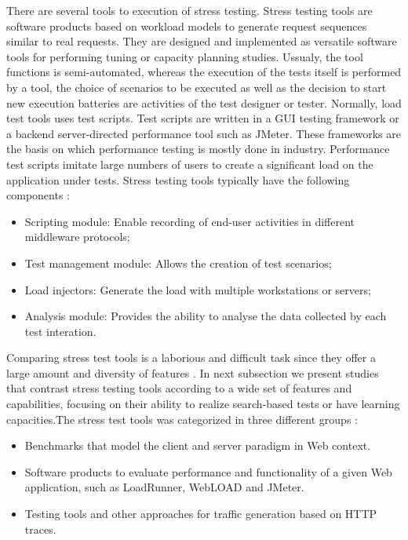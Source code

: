 \documentclass{report}
\begin{document}
There are several tools to execution of stress testing. Stress testing tools are software products based on workload models to generate request sequences similar to real requests. They are designed and implemented as versatile software tools for performing tuning or capacity planning studies. Ussualy, the tool functions is semi-automated, whereas the execution of the tests itself is performed by a tool, the choice of scenarios to be executed as well as the decision to start new execution batteries are activities of the test designer or tester. Normally, load test tools uses test scripts. Test scripts are written in a GUI testing framework or a backend server-directed performance tool such as JMeter. These frameworks are the basis on which performance testing is mostly done in industry. Performance test scripts imitate large numbers of users to create a significant load on the application under tests. Stress testing tools typically have the following components \cite{Grechanik2012} \cite{Molyneaux2009}:

\begin{itemize}
\item Scripting module: Enable recording of end-user activities in different middleware protocols;
\item Test management module: Allows the creation of test scenarios;
\item Load injectors: Generate the load with multiple workstations or servers;
\item Analysis module: Provides the ability to analyse the data collected by each test interation.
\end{itemize}


Comparing stress test tools is a laborious and difficult task since they offer a large amount and diversity of features \cite{Dustin1999}. In next subsection we present studies that contrast stress testing tools according to a wide set of features and capabilities, focusing on their ability to realize search-based tests or have learning capacities.The stress test tools was categorized in three different groups \cite{MohammadS.Obaidat}:

\begin{itemize}
\item Benchmarks that model the client and server paradigm in Web context.
\item Software products to evaluate performance and functionality of a given Web application, such as LoadRunner, WebLOAD and JMeter.
\item Testing tools and other approaches for traffic generation based on HTTP traces.
\end{itemize}
\end{document}

